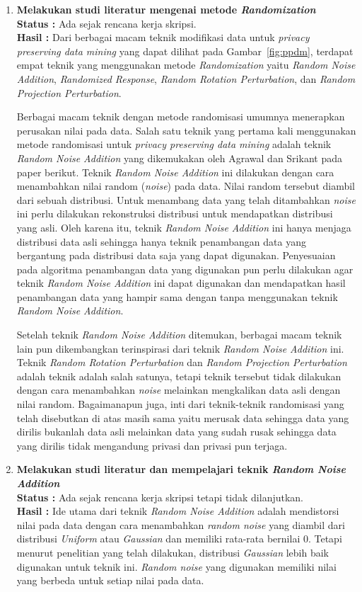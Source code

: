 \documentclass[a4paper,twoside]{article}
\begin{document}
\begin{enumerate}
		\item \textbf{Melakukan studi literatur mengenai metode \textit{Randomization}}\\
		{\bf Status :} Ada sejak rencana kerja skripsi.\\
		{\bf Hasil :} Dari berbagai macam teknik modifikasi data untuk \textit{privacy preserving data mining} yang dapat dilihat pada Gambar~\ref{fig:ppdm}, terdapat empat teknik yang menggunakan metode \textit{Randomization} yaitu \textit{Random Noise Addition}, \textit{Randomized Response}, \textit{Random Rotation Perturbation}, dan \textit{Random Projection Perturbation}.

		Berbagai macam teknik dengan metode randomisasi umumnya menerapkan perusakan nilai pada data. Salah satu teknik yang pertama kali menggunakan metode randomisasi untuk \textit{privacy preserving data mining} adalah teknik \textit{Random Noise Addition} yang dikemukakan oleh Agrawal dan Srikant pada paper berikut. Teknik \textit{Random Noise Addition} ini dilakukan dengan cara menambahkan nilai random (\textit{noise}) pada data. Nilai random tersebut diambil dari sebuah distribusi. Untuk menambang data yang telah ditambahkan \textit{noise} ini perlu dilakukan rekonstruksi distribusi untuk mendapatkan distribusi yang asli. Oleh karena itu, teknik \textit{Random Noise Addition} ini hanya menjaga distribusi data asli sehingga hanya teknik penambangan data yang bergantung pada distribusi data saja yang dapat digunakan. Penyesuaian pada algoritma penambangan data yang digunakan pun perlu dilakukan agar teknik \textit{Random Noise Addition} ini dapat digunakan dan mendapatkan hasil penambangan data yang hampir sama dengan tanpa menggunakan teknik \textit{Random Noise Addition}.
		
		Setelah teknik \textit{Random Noise Addition} ditemukan, berbagai macam teknik lain pun dikembangkan terinspirasi dari teknik \textit{Random Noise Addition} ini. Teknik \textit{Random Rotation Perturbation} dan \textit{Random Projection Perturbation} adalah teknik adalah salah satunya, tetapi teknik tersebut tidak dilakukan dengan cara menambahkan \textit{noise} melainkan mengkalikan data asli dengan nilai random. Bagaimanapun juga, inti dari teknik-teknik randomisasi yang telah disebutkan di atas masih sama yaitu merusak data sehingga data yang dirilis bukanlah data asli melainkan data yang sudah rusak sehingga data yang dirilis tidak mengandung privasi dan privasi pun terjaga.
		
		\item \textbf{Melakukan studi literatur dan mempelajari teknik \textit{Random Noise Addition}}\\
		{\bf Status :} Ada sejak rencana kerja skripsi tetapi tidak dilanjutkan.\\
		{\bf Hasil :} Ide utama dari teknik \textit{Random Noise Addition} adalah mendistorsi nilai pada data dengan cara menambahkan \textit{random noise} yang diambil dari distribusi \textit{Uniform} atau \textit{Gaussian} dan memiliki rata-rata bernilai 0. Tetapi menurut penelitian yang telah dilakukan, distribusi \textit{Gaussian} lebih baik digunakan untuk teknik ini. \textit{Random noise} yang digunakan memiliki nilai yang berbeda untuk setiap nilai pada data.


\end{enumerate}
\end{document}
